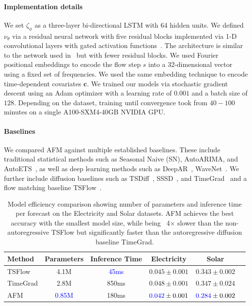 \documentclass[a4paper,10pt,twocolumn,preprint,3p]{elsarticle}
\begin{document}
\paragraph{Implementation details} We set $\zeta_\phi$ as a three-layer bi-directional LSTM with 64 hidden units. We defined $\nu_\theta$ via a residual neural network with five residual blocks implemented via 1-D convolutional layers with gated activation functions~\citep{van2016wavenet, kong2020diffwave}. The architecture is similar to the network used in~\citep{rasul2021autoregressive} but with fewer residual blocks. We used Fourier positional embeddings to encode the flow step $s$ into a 32-dimensional vector using a fixed set of frequencies. We used the same embedding technique to encode time-dependent covariates $\mathbf{c}$. We trained our models via stochastic gradient descent using an Adam optimizer with a learning rate of $0.001$ and a batch size of $128$. Depending on the dataset, training until convergence took from $40-100$ minutes on a single A100-SXM4-40GB NVIDIA GPU. 


\paragraph{Baselines} We compared AFM against multiple established baselines.
These include traditional statistical methods such as Seasonal Naive (SN), AutoARIMA, and AutoETS~\citep{hyndman2008forecasting}, as well as deep learning methods such as DeepAR~\citep{salinas2020deepar}, WaveNet~\citep{van2016wavenet}. We further include diffusion baselines such as TSDiff~\citep{kollovieh2023predict}, SSSD~\citep{alcaraz2022diffusion}, and TimeGrad~\citep{rasul2021autoregressive} and a flow matching baseline TSFlow~\citep{Kerrigan2024Flow}.



\begin{table}[htbp]
  \centering
  \caption{Model efficiency comparison showing number of parameters and inference time per forecast on the Electricity and Solar datasets. AFM achieves the best accuracy with the smallest model size, while being ~4× slower than the non-autoregressive TSFlow but significantly faster than the autoregressive diffusion baseline TimeGrad.}
  \label{tab:efficiency}
\begin{small}
  \begin{tabular}{lccccc}
    \toprule
    Method & Parameters & Inference Time & Electricity & Solar \\
    \midrule
    TSFlow   & \phantom{0}4.1M & \phantom{0}\textcolor{blue}{45ms}  & $0.045 \pm 0.001$ & $0.343 \pm 0.002$ \\
    TimeGrad & \phantom{0}2.8M & 850ms & $0.048 \pm 0.001$ & $0.347 \pm 0.024$ \\
    AFM      & \textcolor{blue}{0.85M} & 180ms & $\textcolor{blue}{0.042} \pm 0.001$ & $\textcolor{blue}{0.284} \pm 0.002$ \\
    \bottomrule
  \end{tabular}
  \end{small}
\end{table}
\end{document}
